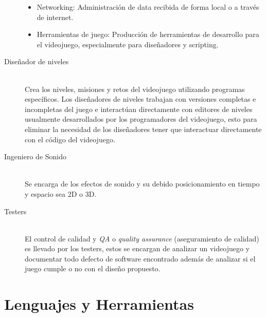 \begin{description}
\begin{itemize}
\item Networking: Administración de data recibida de forma local o a través de internet. 
\item Herramientas de juego: Producción de herramientas de desarrollo para el videojuego, especialmente para diseñadores y scripting.
\end{itemize}
\small
\item[Diseñador de niveles] \hfill \\
Crea los niveles, misiones y retos del videojuego utilizando programas específicos. Los diseñadores de niveles trabajan con versiones completas e incompletas del juego e interactúan directamente con editores de niveles usualmente desarrollados por los programadores del videojuego, esto para eliminar la necesidad de los diseñadores tener que interactuar directamente con el código del videojuego.
\item[Ingeniero de Sonido] \hfill \\
Se encarga de los efectos de sonido y su debido posicionamiento en tiempo y espacio sea 2D o 3D.
\item[Testers] \hfill \\
El control de calidad y \emph{QA} o \emph{quality assurance} (aseguramiento de calidad) es llevado por los testers, estos se encargan de analizar un videojuego y documentar todo defecto de software encontrado además de analizar si el juego cumple o no con el diseño propuesto.
\end{description}

\section{Lenguajes y Herramientas}

